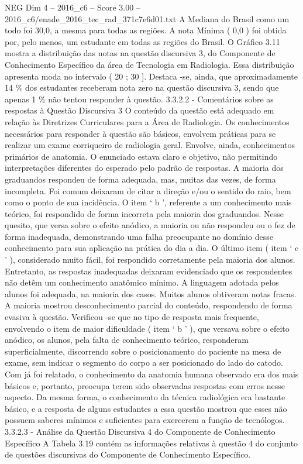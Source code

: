 \begin{textsample}{NEG Dim 4 – 2016\_c6 – Score 3.00 – 2016\_c6/enade\_2016\_tec\_rad\_371c7e6d01.txt}
A Mediana do Brasil como um todo foi 30,0, a mesma para todas as regiões.
A nota Mínima ( 0,0 ) foi obtida por, pelo menos, um estudante em todas as regiões do Brasil.
O Gráfico 3.11 mostra a distribuição das notas na questão discursiva 3, do Componente de Conhecimento Específico da área de Tecnologia em Radiologia.
Essa distribuição apresenta moda no intervalo ( 20 ; 30 ].
Destaca -se, ainda, que aproximadamente 14 \% dos estudantes receberam nota zero na questão discursiva 3, sendo que apenas 1 \% não tentou responder à questão. 3.3.2.2 - Comentários sobre as respostas à Questão Discursiva 3 O conteúdo da questão está adequado em relação às Diretrizes Curriculares para a Área de Radiologia.
Os conhecimentos necessários para responder à questão são básicos, envolvem práticas para se realizar um exame corriqueiro de radiologia geral.
Envolve, ainda, conhecimentos primários de anatomia.
O enunciado estava claro e objetivo, não permitindo interpretações diferentes do esperado pelo padrão de respostas.
A maioria dos graduandos respondeu de forma adequada, mas, muitas das vezes, de forma incompleta.
Foi comum deixaram de citar a direção e/ou o sentido do raio, bem como o ponto de sua incidência.
O item ‘ b ’, referente a um conhecimento mais teórico, foi respondido de forma incorreta pela maioria dos graduandos.
Nesse quesito, que versa sobre o efeito anódico, a maioria ou não respondeu ou o fez de forma inadequada, demonstrando uma falha preocupante no domínio desse conhecimento para sua aplicação na prática do dia a dia.
O último item ( item ‘ c ’ ), considerado muito fácil, foi respondido corretamente pela maioria dos alunos.
Entretanto, as respostas inadequadas deixaram evidenciado que os respondentes não detêm um conhecimento anatômico mínimo.
A linguagem adotada pelos alunos foi adequada, na maioria dos casos.
Muitos alunos obtiveram notas fracas.
A maioria mostrou desconhecimento parcial do conteúdo, respondendo de forma evasiva à questão.
Verificou -se que no tipo de resposta mais frequente, envolvendo o item de maior dificuldade ( item ‘ b ’ ), que versava sobre o efeito anódico, os alunos, pela falta de conhecimento teórico, responderam superficialmente, discorrendo sobre o posicionamento do paciente na mesa de exame, sem indicar o segmento do corpo a ser posicionado do lado do catodo.
Com já foi relatado, o conhecimento da anatomia humana observado era dos mais básicos e, portanto, preocupa terem sido observadas respostas com erros nesse aspecto.
Da mesma forma, o conhecimento da técnica radiológica era bastante básico, e a resposta de alguns estudantes a essa questão mostrou que esses não possuem saberes mínimos e suficientes para exercerem a função de tecnólogos. 3.3.2.3 - Análise da Questão Discursiva 4 do Componente de Conhecimento Específico A Tabela 3.19 contém as informações relativas à questão 4 do conjunto de questões discursivas do Componente de Conhecimento Específico.

\end{textsample}
